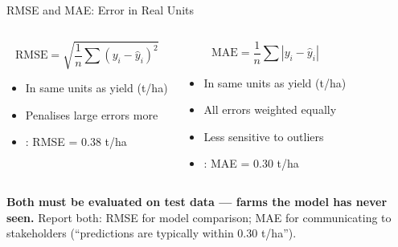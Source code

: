 \documentclass[aspectratio=169,10pt]{beamer}
\begin{document}
\begin{frame}{RMSE and MAE: Error in Real Units}
  \begin{columns}
      \begin{tcolorbox}[mybox,title={\bfseries Root Mean Squared Error}]
        \[
          \text{RMSE} = \sqrt{\frac{1}{n}\sum(y_i-\hat{y}_i)^2}
        \]
        \small\begin{itemize}
          \item In same units as yield (t/ha)
          \item Penalises large errors more
          \item \dataset{}: RMSE = 0.38 t/ha
        \end{itemize}
      \end{tcolorbox}
      \begin{tcolorbox}[mybox,title={\bfseries Mean Absolute Error}]
        \[
          \text{MAE} = \frac{1}{n}\sum|y_i-\hat{y}_i|
        \]
        \small\begin{itemize}
          \item In same units as yield (t/ha)
          \item All errors weighted equally
          \item Less sensitive to outliers
          \item \dataset{}: MAE = 0.30 t/ha
        \end{itemize}
      \end{tcolorbox}
  \end{columns}
  \vspace{0.4cm}
  \begin{tcolorbox}[keybox]
    \small\textbf{Both must be evaluated on test data --- farms the model has never seen.}
    Report both: RMSE for model comparison; MAE for communicating to stakeholders
    (``predictions are typically within 0.30 t/ha'').
  \end{tcolorbox}
\end{frame}
\end{document}
